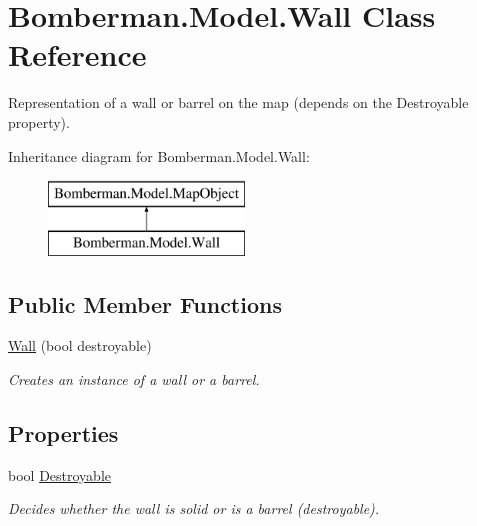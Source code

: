 \hypertarget{class_bomberman_1_1_model_1_1_wall}{}\section{Bomberman.\+Model.\+Wall Class Reference}
\label{class_bomberman_1_1_model_1_1_wall}


Representation of a wall or barrel on the map (depends on the Destroyable property).  


Inheritance diagram for Bomberman.\+Model.\+Wall\+:\begin{figure}[H]
\begin{center}
\leavevmode
\includegraphics[height=2.000000cm]{class_bomberman_1_1_model_1_1_wall}
\end{center}
\end{figure}
\subsection*{Public Member Functions}
\begin{DoxyCompactItemize}
\item 
\mbox{\hyperlink{class_bomberman_1_1_model_1_1_wall_a32c29562460df6afe031561e0f820816}{Wall}} (bool destroyable)
\begin{DoxyCompactList}\small\item\em Creates an instance of a wall or a barrel. \end{DoxyCompactList}\end{DoxyCompactItemize}
\subsection*{Properties}
\begin{DoxyCompactItemize}
\item 
bool \mbox{\hyperlink{class_bomberman_1_1_model_1_1_wall_a312f4910b33fded83e14ccc2afe34f91}{Destroyable}}
\begin{DoxyCompactList}\small\item\em Decides whether the wall is solid or is a barrel (destroyable). \end{DoxyCompactList}\end{DoxyCompactItemize}


